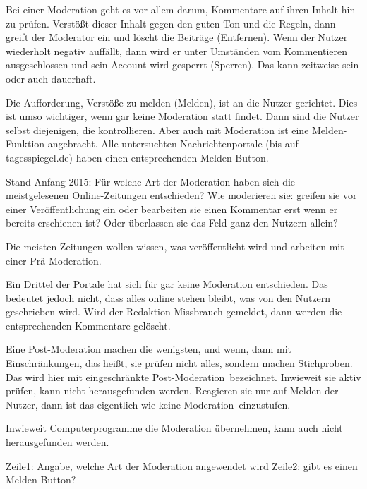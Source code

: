 
Bei einer Moderation geht es vor allem darum, Kommentare auf ihren Inhalt hin zu
prüfen. Verstößt dieser Inhalt gegen den guten Ton und die Regeln, dann greift
der Moderator ein und löscht die Beiträge (Entfernen). Wenn der Nutzer
wiederholt negativ auffällt, dann wird er unter Umständen vom Kommentieren
ausgeschlossen und sein Account wird gesperrt (Sperren). Das kann zeitweise sein
oder auch dauerhaft.

Die Aufforderung, Verstöße zu melden (Melden), ist an die Nutzer gerichtet. Dies
ist umso wichtiger, wenn gar keine Moderation statt findet. Dann sind die Nutzer
selbst diejenigen, die kontrollieren. Aber auch mit Moderation ist eine
Melden-Funktion angebracht. Alle  untersuchten Nachrichtenportale (bis auf
tagesspiegel.de) haben einen entsprechenden Melden-Button.

Stand Anfang 2015: Für welche Art der Moderation haben sich die meistgelesenen
Online-Zeitungen entschieden? Wie moderieren sie: greifen sie vor einer
Veröffentlichung ein oder bearbeiten sie einen Kommentar erst wenn er bereits
erschienen ist? Oder überlassen sie das Feld ganz den Nutzern allein?

Die meisten Zeitungen wollen wissen, was veröffentlicht wird und arbeiten mit
einer Prä-Moderation.

Ein Drittel der Portale hat sich für gar keine Moderation entschieden. Das
bedeutet jedoch nicht, dass alles online stehen bleibt, was von den Nutzern
geschrieben wird. Wird der Redaktion Missbrauch gemeldet, dann werden die
entsprechenden Kommentare gelöscht.

Eine Post-Moderation machen die wenigsten, und wenn, dann mit Einschränkungen,
das heißt, sie prüfen nicht alles, sondern machen Stichproben. Das wird hier mit
\glqq eingeschränkte Post-Moderation\grqq\ bezeichnet. Inwieweit sie aktiv prüfen,
kann nicht herausgefunden werden. Reagieren sie nur auf Melden der Nutzer, dann
ist das eigentlich wie \glqq keine Moderation\grqq\ einzustufen.

Inwieweit Computerprogramme die Moderation übernehmen, kann auch nicht
herausgefunden werden.

Zeile1: Angabe, welche Art der Moderation angewendet wird
Zeile2: gibt es einen Melden-Button?

